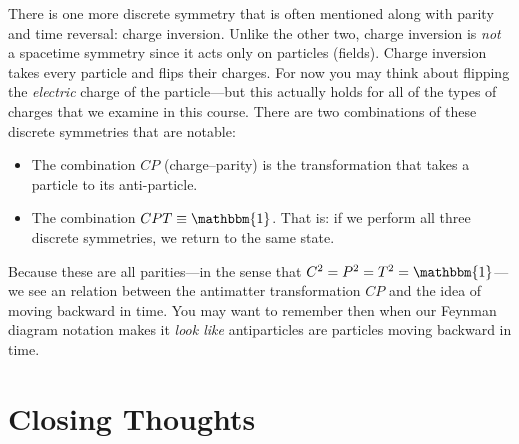 \documentclass[12pt, oneside]{report}    %
\begin{document}
\begin{subappendices}
There is one more discrete symmetry that is often mentioned along with parity and time reversal: charge inversion. Unlike the other two, charge inversion is \emph{not} a spacetime symmetry since it acts only on particles (fields). Charge inversion takes every particle and flips their charges. For now you may think about flipping the \emph{electric} charge of the particle---but this actually holds for all of the types of charges that we examine in this course. There are two combinations of these discrete symmetries that are notable:
\begin{itemize}
    \item The combination $CP$ (charge--parity) is the transformation that takes a particle to its anti-particle.
    \item The combination $CPT \equiv \mathbbm{1}$. That is: if we perform all three discrete symmetries, we return to the same state.
\end{itemize}
Because these are all parities---in the sense that $C^2 = P^2 = T^2 = \mathbbm{1}$---we see an relation between the antimatter transformation $CP$ and the idea of moving backward in time. You may want to remember then when our Feynman diagram notation makes it \emph{look like} antiparticles are particles moving backward in time.







\end{subappendices}













\chapter{Closing Thoughts}
\end{document}
